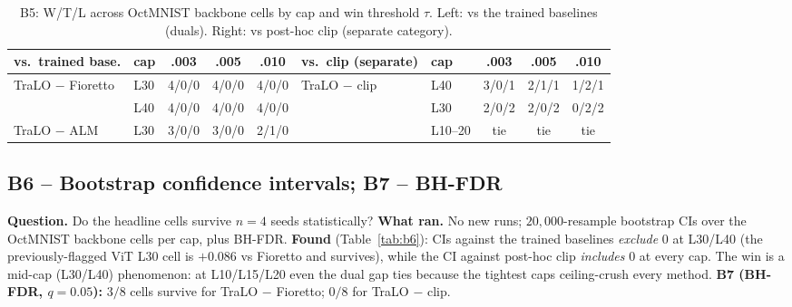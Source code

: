 \documentclass[11pt,a4paper]{article}
\begin{document}
\begin{table}[h]\centering\small
\begin{tabular}{llccc@{\hskip 1.2cm}llccc}
\toprule
vs.\ trained base. & cap & .003 & .005 & .010 & vs.\ clip (separate) & cap & .003 & .005 & .010 \\
\midrule
TraLO $-$ Fioretto & L30 & 4/0/0 & 4/0/0 & 4/0/0 & TraLO $-$ clip & L40 & 3/0/1 & 2/1/1 & 1/2/1 \\
                   & L40 & 4/0/0 & 4/0/0 & 4/0/0 &                & L30 & 2/0/2 & 2/0/2 & 0/2/2 \\
TraLO $-$ ALM      & L30 & 3/0/0 & 3/0/0 & 2/1/0 &                & L10--20 & tie & tie & tie \\
\bottomrule
\end{tabular}
\caption{B5: W/T/L across OctMNIST backbone cells by cap and win threshold $\tau$. Left: vs the trained
baselines (duals). Right: vs post-hoc clip (separate category).}
\label{tab:b5}
\end{table}

\subsection{B6 -- Bootstrap confidence intervals; B7 -- BH-FDR}
\textbf{Question.} Do the headline cells survive $n=4$ seeds statistically? \textbf{What ran.} No new runs;
$20{,}000$-resample bootstrap CIs over the OctMNIST backbone cells per cap, plus BH-FDR. \textbf{Found}
(Table~\ref{tab:b6}): CIs against the trained baselines \emph{exclude} $0$ at L30/L40 (the previously-flagged
ViT L30 cell is $+0.086$ vs Fioretto and survives), while the CI against post-hoc clip \emph{includes} $0$ at
every cap. The win is a mid-cap (L30/L40) phenomenon: at L10/L15/L20 even the dual gap ties because the
tightest caps ceiling-crush every method. \textbf{B7 (BH-FDR, $q=0.05$):} $3/8$ cells survive for
TraLO $-$ Fioretto; $0/8$ for TraLO $-$ clip.
\end{document}
